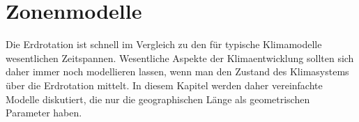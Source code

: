 %
%
%
\chapter{Zonenmodelle\label{chapter:zonenmodelle}}
Die Erdrotation ist schnell im Vergleich zu den für typische Klimamodelle
wesentlichen Zeitspannen.
Wesentliche Aspekte der Klimaentwicklung sollten sich daher immer
noch modellieren lassen, wenn man den Zustand des Klimasystems über
die Erdrotation mittelt.
In diesem Kapitel werden daher vereinfachte Modelle diskutiert,
die nur die geographischen Länge als geometrischen Parameter haben.






